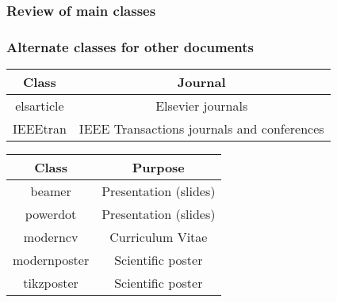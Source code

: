 \documentclass[11pt]{beamer}
\begin{document}
\begin{frame}
	\frametitle{Review of main classes}
	\frametitle{Alternate classes for other documents}
	
	\begin{table}[h]
		\begin{tabular}{*{2}{c}}
			\toprule
			  Class    &                  Journal                   \\ \midrule
			elsarticle &             Elsevier journals              \\
			 IEEEtran  & IEEE Transactions journals and conferences \\ \bottomrule
		\end{tabular}
	\end{table}

	\begin{table}[h]
		\begin{tabular}{*{2}{c}}
			\toprule
			   Class     &        Purpose        \\ \midrule
			   beamer    & Presentation (slides) \\
			  powerdot   & Presentation (slides) \\
			  moderncv   &   Curriculum Vitae    \\
			modernposter &   Scientific poster   \\
			 tikzposter  &   Scientific poster   \\ \bottomrule
		\end{tabular}
	\end{table}
\end{frame}




\end{document}
